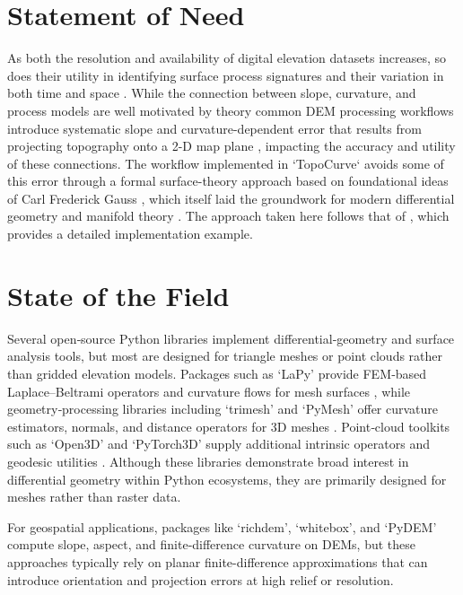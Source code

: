 \documentclass[esurf, manuscript]{copernicus}
\begin{document}
\section{Statement of Need}
As both the resolution and availability of digital elevation datasets increases, so does their utility in identifying surface process signatures and their variation in both time and space \citep{roering2013you-440}.  While the connection between slope, curvature, and process models are well motivated by theory \citep{fernandes1997hillslope-8d8} common DEM processing workflows introduce systematic slope and curvature-dependent error that results from projecting topography onto a 2-D map plane \citep{minr2020comprehensive-9c9,klema2025discrete-964}, impacting the accuracy and utility of these connections. The workflow implemented in `TopoCurve` avoids some of this error through a formal surface-theory approach based on foundational ideas of Carl Frederick Gauss \citep{Gauss1902General1825}, which itself laid the groundwork for modern differential geometry and manifold theory \citep{pesic2007beyond}. The approach taken here follows that of \citet{klema2025discrete-964}, which provides a detailed implementation example. 

\section{State of the Field}
Several open‐source Python libraries implement differential‐geometry and surface analysis tools, but most are designed for triangle meshes or point clouds rather than gridded elevation models. Packages such as `LaPy' provide FEM‐based Laplace--Beltrami operators and curvature flows for mesh surfaces \citep{lapy2023LaPy}, while geometry‐processing libraries including `trimesh' and `PyMesh' offer curvature estimators, normals, and distance operators for 3D meshes \citep{trimesh2019, pymeshlibrary}. Point‐cloud toolkits such as `Open3D' and `PyTorch3D' supply additional intrinsic operators and geodesic utilities \citep{open3d2018, pytorch3d2020}. Although these libraries demonstrate broad interest in differential geometry within Python ecosystems, they are primarily designed for meshes rather than raster data.  

For geospatial applications, packages like `richdem', `whitebox', and `PyDEM' compute slope, aspect, and finite‐difference curvature on DEMs, but these approaches typically rely on planar finite-difference approximations that can introduce orientation and projection errors at high relief or resolution\citep{barnes2016richdem, jenness2013whitbox, balut2020pydem}. 
\end{document}
